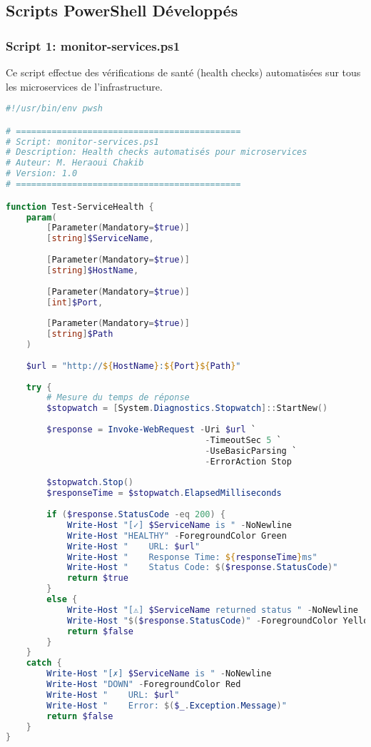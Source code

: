 \documentclass[11pt,a4paper]{report}
\begin{document}
\subsection{Scripts PowerShell Développés}

\subsubsection{Script 1: monitor-services.ps1}

Ce script effectue des vérifications de santé (health checks) automatisées sur tous les microservices de l'infrastructure.

\begin{lstlisting}[language=PowerShell, caption=monitor-services.ps1 - Health Checks Automatisés, basicstyle=\ttfamily\tiny]
#!/usr/bin/env pwsh

# ============================================
# Script: monitor-services.ps1
# Description: Health checks automatisés pour microservices
# Auteur: M. Heraoui Chakib
# Version: 1.0
# ============================================

function Test-ServiceHealth {
    param(
        [Parameter(Mandatory=$true)]
        [string]$ServiceName,
        
        [Parameter(Mandatory=$true)]
        [string]$HostName,
        
        [Parameter(Mandatory=$true)]
        [int]$Port,
        
        [Parameter(Mandatory=$true)]
        [string]$Path
    )
    
    $url = "http://${HostName}:${Port}${Path}"
    
    try {
        # Mesure du temps de réponse
        $stopwatch = [System.Diagnostics.Stopwatch]::StartNew()
        
        $response = Invoke-WebRequest -Uri $url `
                                       -TimeoutSec 5 `
                                       -UseBasicParsing `
                                       -ErrorAction Stop
        
        $stopwatch.Stop()
        $responseTime = $stopwatch.ElapsedMilliseconds
        
        if ($response.StatusCode -eq 200) {
            Write-Host "[✓] $ServiceName is " -NoNewline
            Write-Host "HEALTHY" -ForegroundColor Green
            Write-Host "    URL: $url"
            Write-Host "    Response Time: ${responseTime}ms"
            Write-Host "    Status Code: $($response.StatusCode)"
            return $true
        }
        else {
            Write-Host "[⚠] $ServiceName returned status " -NoNewline
            Write-Host "$($response.StatusCode)" -ForegroundColor Yellow
            return $false
        }
    }
    catch {
        Write-Host "[✗] $ServiceName is " -NoNewline
        Write-Host "DOWN" -ForegroundColor Red
        Write-Host "    URL: $url"
        Write-Host "    Error: $($_.Exception.Message)"
        return $false
    }
}


\end{lstlisting}
\end{document}

